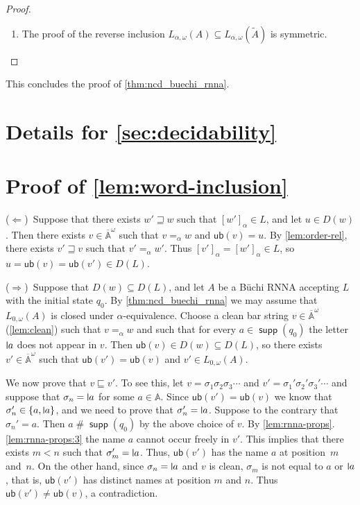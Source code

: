 \documentclass[10pt,a4paper]{amsart}
\newcommand{\midmid}{\hspace{0.2ex}{\rule[-0.1ex]{0.6pt}{1.65ex}}\hspace{0.2ex}}
\newcommand{\newletter}[1]{{\midmid}#1}
\newcommand{\barA}{\overline{\names}}
\newcommand{\ub}{\mathsf{ub}}
\numberwithin{equation}{section}
\newcommand{\seq}{\subseteq}
\newcommand{\tl}{\widetilde}
\newcommand{\+}[1]{\mathcal{#1}\xspace}
\newcommand{\names}{\mathbb{A}}
\DeclareMathOperator{\supp}{\mathsf{supp}} %
\newcommand{\fresh}{\mathbin{\#}}
\theoremstyle{definition}
\begin{document}
\begin{proof}
\begin{enumerate}
  \item The proof of the reverse inclusion
    $L_{\alpha,\omega}(A)\seq L_{\alpha,\omega}(\tl{A})$ is
    symmetric.\qedhere
  \end{enumerate}
\end{proof}

This concludes the proof of \autoref{thm:ncd_buechi_rnna}.

\section{Details for \autoref{sec:decidability}}

\section*{Proof of \autoref{lem:word-inclusion}}
  ($\Leftarrow$)~Suppose that there exists
  $w'\sqsupseteq w$ such that $[w']_\alpha\in L$, and let $u\in
  D(w)$. Then there exists $v\in \barA^\omega$ such that $v=_\alpha w$
  and $\ub(v)=u$. By \autoref{lem:order-rel}, there exists
  $v'\sqsupseteq v$ such that $v'=_\alpha w'$. Thus
  $[v']_\alpha = [w']_\alpha\in L$, so $u=\ub(v)=\ub(v')\in D(L)$.

  \smallskip\noindent ($\Rightarrow$)~Suppose that $D(w)\seq D(L)$,
  and let $A$ be a Büchi RNNA accepting $L$ with the initial state
  $q_0$. By \autoref{thm:ncd_buechi_rnna} we may assume that
  $L_{0,\omega}(A)$ is closed under $\alpha$-equivalence. Choose a
  clean bar string $v\in \barA^\omega$ (\autoref{lem:clean}) such that
  $v=_\alpha w$ and such that for every $a\in \supp(q_0)$ the
  letter $\newletter a$ does not appear in $v$.  Then
  $\ub(v)\in D(w)\seq D(L)$, so there exists $v'\in \barA^\omega$ such
  that $\ub(v')=\ub(v)$ and $v'\in L_{0,\omega}(A)$.

  We now prove that $v\sqsubseteq v'$. To see this, let
  $v=\sigma_1\sigma_2\sigma_3\cdots$ and
  $v'=\sigma_1'\sigma_2'\sigma_3'\cdots$ and suppose that
  $\sigma_n=\newletter a$ for some $a\in \names$. Since
  $\ub(v')=\ub(v)$ we know that $\sigma_n'\in \{a,\newletter a\}$, and
  we need to prove that $\sigma_n'=\newletter a$. Suppose to the
  contrary that $\sigma_n'=a$. Then $a\fresh \supp(q_0)$ by the above
  choice of $v$. By \autoref{lem:rnna-props}.\ref{lem:rnna-props:3}
  the name $a$ cannot occur freely in $v'$. This implies that there
  exists $m<n$ such that $\sigma'_m=\newletter a$. Thus, $\ub(v')$ has
  the name $a$ at position~$m$ and~$n$. On the other hand, since
  $\sigma_n=\newletter a$ and $v$ is clean, $\sigma_m$ is not equal to
  $a$ or $\newletter a$, that is, $\ub(v')$ has distinct names at
  position $m$ and $n$. Thus $\ub(v')\neq \ub(v)$, a
  contradiction. %
\end{document}
